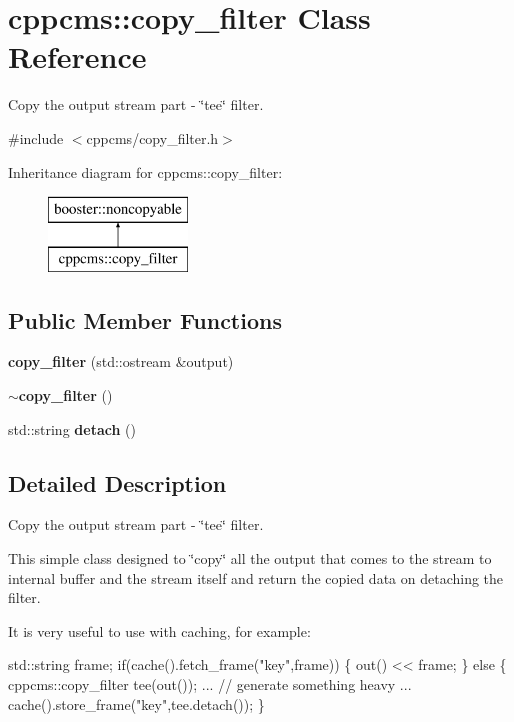 \section{cppcms\+:\+:copy\+\_\+filter Class Reference}
\label{classcppcms_1_1copy__filter}


Copy the output stream part -\/ \char`\"{}tee\char`\"{} filter.  




{\ttfamily \#include $<$cppcms/copy\+\_\+filter.\+h$>$}

Inheritance diagram for cppcms\+:\+:copy\+\_\+filter\+:\begin{figure}[H]
\begin{center}
\leavevmode
\includegraphics[height=2.000000cm]{classcppcms_1_1copy__filter}
\end{center}
\end{figure}
\subsection*{Public Member Functions}
\begin{DoxyCompactItemize}
\item 
{\bf copy\+\_\+filter} (std\+::ostream \&output)
\item 
{\bf $\sim$copy\+\_\+filter} ()
\item 
std\+::string {\bf detach} ()
\end{DoxyCompactItemize}


\subsection{Detailed Description}
Copy the output stream part -\/ \char`\"{}tee\char`\"{} filter. 

This simple class designed to \char`\"{}copy\char`\"{} all the output that comes to the stream to internal buffer and the stream itself and return the copied data on detaching the filter.

It is very useful to use with caching, for example\+:


\begin{DoxyCode}
std::string frame;
\textcolor{keywordflow}{if}(cache().fetch\_frame(\textcolor{stringliteral}{"key"},frame)) \{
  out() << frame;
\}
\textcolor{keywordflow}{else} \{
  cppcms::copy_filter tee(out());
  ...
  \textcolor{comment}{// generate something heavy}
  ...
  cache().store\_frame(\textcolor{stringliteral}{"key"},tee.detach());
\}
\end{DoxyCode}
 

